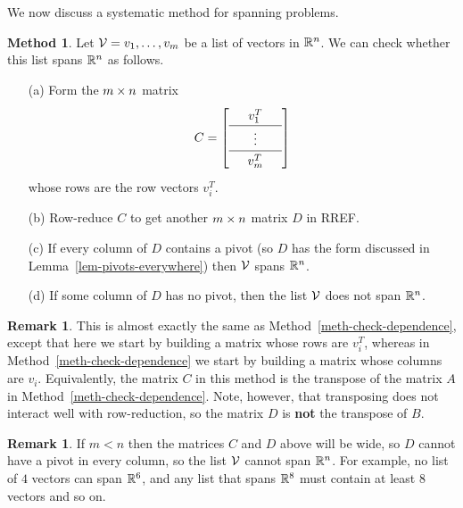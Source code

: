 \documentclass[reqno]{amsart}
\theoremstyle{definition}
\newtheorem{remark}[theorem]{Remark}
\newtheorem{method}[theorem]{Method}
\begin{document}
We now discuss a systematic method for spanning problems.

\begin{method}\label{meth-check-span}
 Let $\mathcal{V}=v_1,\dotsc,v_m$ be a list of vectors in ${\mathbb{R}}^n$.  We can
 check whether this list spans ${\mathbb{R}}^n$ as follows.
 \begin{itemize}
  \item[(a)] Form the $m\times n$ matrix
   \[ \renewcommand{\arraystretch}{1.3}
       C = \left[\begin{array}{ccc}
              & v_1^T & \\ \hline
              & \vdots & \\ \hline
              & v_m^T &
            \end{array}\right]
   \]
   whose rows are the row vectors $v_i^T$.
  \item[(b)] Row-reduce $C$ to get another $m\times n$ matrix $D$ in
   RREF.
  \item[(c)] If every column of $D$ contains a pivot (so $D$ has the
   form discussed in Lemma~\ref{lem-pivots-everywhere}) then $\mathcal{V}$
   spans ${\mathbb{R}}^n$.
  \item[(d)] If some column of $D$ has no pivot, then the list $\mathcal{V}$
   does not span ${\mathbb{R}}^n$.
 \end{itemize}
\end{method}
\begin{remark}\label{rem-dual-methods}
 This is almost exactly the same as
 Method~\ref{meth-check-dependence}, except that here we start by
 building a matrix whose rows are $v_i^T$, whereas in
 Method~\ref{meth-check-dependence} we start by building a matrix
 whose columns are $v_i$.  Equivalently, the matrix $C$ in this method
 is the transpose of the matrix $A$ in
 Method~\ref{meth-check-dependence}.  Note, however, that transposing
 does not interact well with row-reduction, so the matrix $D$ is
 \textbf{not} the transpose of $B$.
\end{remark}
\begin{remark}\label{rem-spanning-shortcut}
 If $m<n$ then the matrices $C$ and $D$ above will be wide, so $D$
 cannot have a pivot in every column, so the list $\mathcal{V}$ cannot span
 ${\mathbb{R}}^n$.  For example, no list of $4$ vectors can span ${\mathbb{R}}^6$, and any
 list that spans ${\mathbb{R}}^8$ must contain at least $8$ vectors and so on.
\end{remark}
\end{document}
